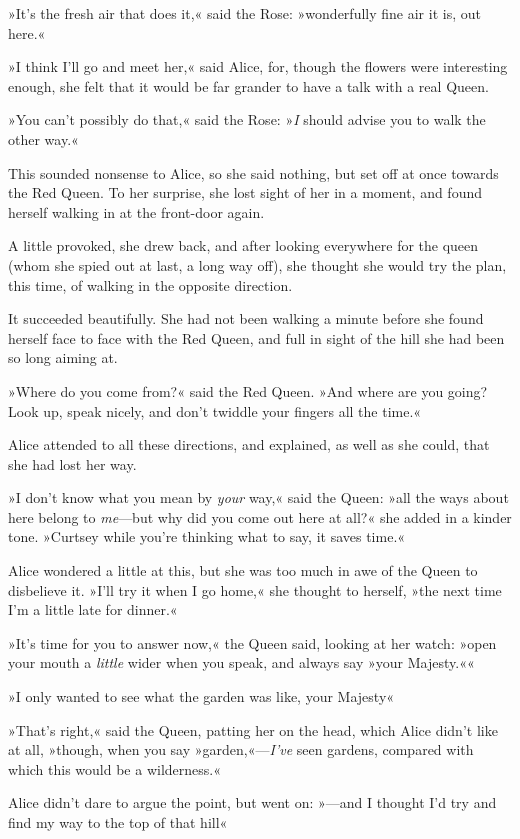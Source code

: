 »It's the fresh air that does it,« said the Rose: »wonderfully fine air it is, out here.«

»I think I'll go and meet her,« said Alice, for, though the flowers were interesting enough, she felt that it would be far grander to have a talk with a real Queen.

»You can't possibly do that,« said the Rose: »\textit{I} should advise you to walk the other way.«

This sounded nonsense to Alice, so she said nothing, but set off at once towards the Red Queen. To her surprise, she lost sight of her in a moment, and found herself walking in at the front-door again.

A little provoked, she drew back, and after looking everywhere for the queen (whom she spied out at last, a long way off), she thought she would try the plan, this time, of walking in the opposite direction.

It succeeded beautifully. She had not been walking a minute before she found herself face to face with the Red Queen, and full in sight of the hill she had been so long aiming at.

»Where do you come from?« said the Red Queen. »And where are you going? Look up, speak nicely, and don't twiddle your fingers all the time.«

Alice attended to all these directions, and explained, as well as she could, that she had lost her way.

»I don't know what you mean by \textit{your} way,« said the Queen: »all the ways about here belong to \textit{me}—but why did you come out here at all?« she added in a kinder tone. »Curtsey while you're thinking what to say, it saves time.«

Alice wondered a little at this, but she was too much in awe of the Queen to disbelieve it. »I'll try it when I go home,« she thought to herself, »the next time I'm a little late for dinner.«

»It's time for you to answer now,« the Queen said, looking at her watch: »open your mouth a \textit{little} wider when you speak, and always say »your Majesty.««

»I only wanted to see what the garden was like, your Majesty\longdash«

»That's right,« said the Queen, patting her on the head, which Alice didn't like at all, »though, when you say »garden,«—\textit{I've} seen gardens, compared with which this would be a wilderness.«

Alice didn't dare to argue the point, but went on: »—and I thought I'd try and find my way to the top of that hill\longdash«

